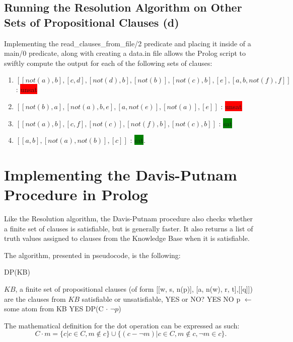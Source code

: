 \documentclass{article}
\begin{document}
\subsection{Running the Resolution Algorithm on Other Sets of Propositional Clauses (d)}
Implementing the read\_clauses\_from\_file/2 predicate and placing it inside of a main/0 predicate, along with creating a data.in file allows the Prolog script to swiftly compute the output for each of the following sets of clauses:
\begin{enumerate}
	\item $[[not(a), b], [c,d], [not(d), b], [not(b)], [not(c), b], [e], [a, b, not(f), f]]$ : \colorbox{red}{unsat}
	\item $[[not(b),a], [not(a),b,e], [a, not(e)], [not(a)], [e]]$ : \colorbox{red}{unsat}
	\item $[[not(a),b], [c,f], [not(c)], [not(f),b], [not(c),b]]$ : \colorbox{green} {sat}
	\item $[[a,b], [not(a), not(b)], [c]]$ : \colorbox{green}{sat}.
\end{enumerate} 

\section{Implementing the Davis-Putnam Procedure in Prolog}
Like the Resolution algorithm, the Davis-Putnam procedure also checks whether a finite set of clauses is satisfiable, but is generally faster. It also returns a list of truth values assigned to clauses from the Knowledge Base when it is satisfiable.

The algorithm, presented in pseudocode, is the following\cite{Resolution}: 
\begin{algorithm}
\begin{algorithmic}
\caption{DP(KB)}\label{alg:cap}
\Require $KB$, a finite set of propositional clauses (of form [[w, s, n(p)], [a, n(w), r, t],[[q]])
\Ensure are the clauses from $KB$ satisfiable or unsatisfiable, YES or NO?
	\State \Return YES
\EndIf
{} \State \Return NO
\EndIf
\State p $\gets$ some atom from KB
\State \Return YES
\Else 
\State \Return DP(C $\cdot$ $\neg p$)
\EndIf
\end{algorithmic}
\end{algorithm}

The mathematical definition for the dot operation can be expressed as such:
$$
C \cdot m=\{c | c \in C, m \not\in c\} \cup \{(c- \neg m) | c \in C, m \not\in c, \neg m \in c\}.
$$
\end{document}

